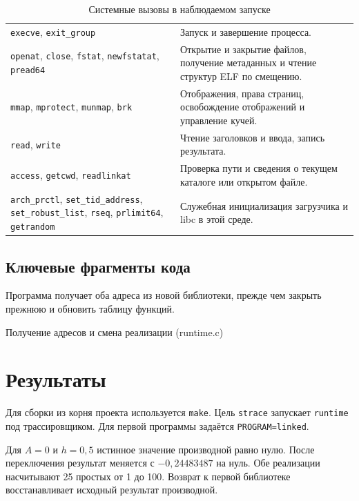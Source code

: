 \documentclass[12pt,a4paper]{article}
\begin{document}
\begin{table}[H]
\caption{Системные вызовы в наблюдаемом запуске}
\small
\begin{tabularx}{\linewidth}{|P{7cm}|L|}
\hline
{} &  \\ \hline
\texttt{execve}, \texttt{exit\_group} & Запуск и завершение процесса. \\ \hline
\texttt{openat}, \texttt{close}, \texttt{fstat}, \texttt{newfstatat}, \texttt{pread64} &
Открытие и закрытие файлов, получение метаданных и чтение структур ELF по смещению. \\ \hline
\texttt{mmap}, \texttt{mprotect}, \texttt{munmap}, \texttt{brk} &
Отображения, права страниц, освобождение отображений и управление кучей. \\ \hline
\texttt{read}, \texttt{write} & Чтение заголовков и ввода, запись результата. \\ \hline
\texttt{access}, \texttt{getcwd}, \texttt{readlinkat} & Проверка пути и сведения о текущем каталоге или открытом файле. \\ \hline
\texttt{arch\_prctl}, \texttt{set\_tid\_address}, \texttt{set\_robust\_list}, \texttt{rseq}, \texttt{prlimit64}, \texttt{getrandom} &
Служебная инициализация загрузчика и libc в этой среде. \\ \hline
\end{tabularx}
\end{table}

\subsection{Ключевые фрагменты кода}
Программа получает оба адреса из новой библиотеки, прежде чем закрыть прежнюю и обновить таблицу функций.

\begin{listingblock}{Получение адресов и смена реализации (runtime.c)}
\end{listingblock}

\clearpage
\section{Результаты}
Для сборки из корня проекта используется \texttt{make}. Цель \texttt{strace} запускает \texttt{runtime} под трассировщиком. Для первой программы задаётся \texttt{PROGRAM=linked}.

Для $A=0$ и $h=0{,}5$ истинное значение производной равно нулю. После переключения результат меняется с $-0{,}24483487$ на нуль. Обе реализации насчитывают 25 простых от 1 до 100. Возврат к первой библиотеке восстанавливает исходный результат производной.
\end{document}
